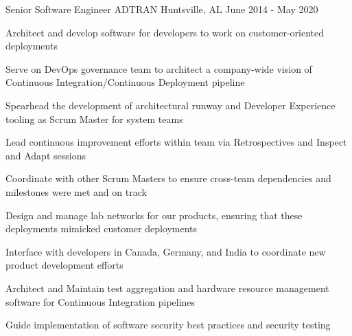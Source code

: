 
\begin{cventries}
  \cventry
    {Senior Software Engineer} %
    {ADTRAN} %
    {Huntsville, AL} %
    {June 2014 - May 2020} %
    {
      \begin{cvitems} %
        \item {Architect and develop software for developers to work on customer-oriented deployments}
        \item {Serve on DevOps governance team to architect a company-wide vision of Continuous Integration/Continuous Deployment pipeline}
        \item {Spearhead the development of architectural runway and Developer Experience tooling as Scrum Master for system teams}
        \item {Lead continuous improvement efforts within team via Retrospectives and Inspect and Adapt sessions}
        \item {Coordinate with other Scrum Masters to ensure cross-team dependencies and milestones were met and on track}
        \item {Design and manage lab networks for our products, ensuring that these deployments mimicked customer deployments}
        \item {Interface with developers in Canada, Germany, and India to coordinate new product development efforts}
        \item {Architect and Maintain test aggregation and hardware resource management software for Continuous Integration pipelines}
        \item {Guide implementation of software security best practices and security testing}
      \end{cvitems}
    }

\end{cventries}
